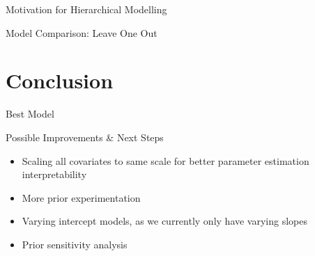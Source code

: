 \documentclass{beamer}
\begin{document}
\begin{frame}{Motivation for Hierarchical Modelling}
\begin{frame}{Model Comparison: Leave One Out}
    \begin{table}[!htbp] \centering 
        \caption{} 
        \label{} 
      \end{table}
\end{frame}



\section{Conclusion}

\begin{frame}{Best Model}
\end{frame}



\begin{frame}{Possible Improvements & Next Steps}
    \begin{itemize}
        \item Scaling all covariates to same scale for better parameter estimation interpretability
        \item More prior experimentation 
        \item Varying intercept models, as we currently only have varying slopes
        \item Prior sensitivity analysis     
    \end{itemize}
\end{frame}









\end{frame}
\end{document}
